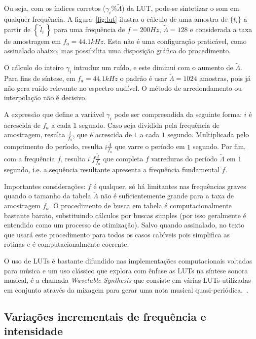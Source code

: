 Ou seja, com os índices corretos ($\gamma_i\%\widetilde{\Lambda}$)
da LUT, pode-se sintetizar o som em qualquer frequência. 
A figura~\ref{fig:lut} ilustra
o cálculo de uma amostra de $\{t_i\}$ 
a partir de $\left\{\,\widetilde{l}_i\,\right\}$ para uma frequência
de $f=200Hz$, $\widetilde{\Lambda}=128$ e considerada a taxa de amostragem em $f_a=44.1kHz$.
Esta não é uma configuração praticável, como assinalado abaixo, mas possibilita uma
disposição gráfica do procedimento.


O cálculo do inteiro $\gamma_i$ introduz um ruído, 
e este diminui com o aumento de $\widetilde{\Lambda}$.
Para fins de síntese, em $f_a=44.1 kHz$
 o padrão é usar $\widetilde{\Lambda} = 1024$ amostras, pois já não gera ruído
 relevante no espectro audível. O método de arredondamento ou interpolação não é decisivo.\cite{Geiger}

 A expressão que define a variável $\gamma_i$ pode ser compreendida da
 seguinte forma: $i$ é acrescida de $f_a$ a cada $1$ segundo.
 Caso seja dividida pela frequência de amostragem, resulta $\frac{i}{f_a}$,
que é acrescida de $1$ a cada $1$ segundo. Multiplicada pelo comprimento do período, resulta $i \frac{\widetilde{\Lambda}}{f_a}$
 que varre o 
  período em $1$ segundo. Por fim,
 com a frequência $f$, resulta $i . f \frac{\widetilde{\Lambda}}{f_a}$
 que completa $f$ varreduras do período  $\widetilde{\Lambda}$ em $1$ segundo, i.e. a sequência
 resultante apresenta a frequência fundamental $f$.

Importantes considerações: $f$ é qualquer, só há limitantes nas frequências
graves quando o tamanho da tabela $\widetilde{\Lambda}$ não é suficientemente grande para a taxa de amostragem
$f_a$. O procedimento de busca em tabela
é computacionalmente bastante barato, substituindo cálculos por buscas simples (por isso geralmente
é entendido como um processo de otimização). Salvo quando assinalado,
no texto que usará este procedimento para todos os casos cabíveis pois
simplifica as rotinas e é computacionalmente coerente.

O uso de LUTs é bastante difundido nas implementações computacionais
voltadas para música e um uso clássico que explora com ênfase
as LUTs na síntese sonora musical, é a  chamada 
\emph{Wavetable Synthesis} que consiste em várias LUTs utilizadas em 
conjunto através da mixagem para gerar uma nota musical quasi-periódica.~\cite{Cook,Wavetable}.


\subsection{Variações incrementais de frequência e intensidade}\label{subsec:vars}

